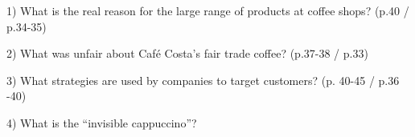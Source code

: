 1) What is the real reason for the large range of products at coffee shops? (p.40 / p.34-35)

2) What was unfair about Café Costa’s fair trade coffee? (p.37-38 / p.33)

3) What strategies are used by companies to target customers? (p. 40-45 / p.36 -40)

4) What is the “invisible cappuccino”?